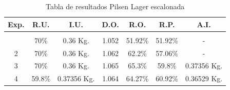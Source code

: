 \begin{longtable}{|p{1cm}|p{1.7cm}|p{2cm}|p{2cm}|p{2cm}| p{1cm}| p{1cm}|}
        \hline
        Exp. %
        & \multicolumn{1}{c|}{R.U.} %
        & \multicolumn{1}{c|}{I.U.} %
        & \multicolumn{1}{c|}{D.O.} %
        & \multicolumn{1}{c|}{R.O.} %
        & \multicolumn{1}{c|}{R.P.} %
        & \multicolumn{1}{c|}{A.I.} %
        \\
        \endfirsthead
        
        \endhead
 
        \endfoot
        
        \hline
        
        \caption{Tabla de resultados Pilsen Lager escalonada\label{tab:ResultadosPilsenEscalonada}}\\
        \endlastfoot
        
        \hline
             \multicolumn{1}{|c|}{1} 
             & \multicolumn{1}{c|}{70\%} 
             & \multicolumn{1}{c|}{0.36 Kg.}
             & \multicolumn{1}{c|}{1.052}
             & \multicolumn{1}{c|}{51.92\%}
             & \multicolumn{1}{c|}{51.92\%} 
             & \multicolumn{1}{c|}{-} \\
             \hline
             
             \multicolumn{1}{|c|}{2} 
             & \multicolumn{1}{c|}{70\%}  
             & \multicolumn{1}{c|}{0.36 Kg.}
             & \multicolumn{1}{c|}{1.062}
             & \multicolumn{1}{c|}{62.2\%}
             & \multicolumn{1}{c|}{57.06\%} 
             & \multicolumn{1}{c|}{-} \\
             \hline
             
             \multicolumn{1}{|c|}{3} 
             & \multicolumn{1}{c|}{70\%} 
             & \multicolumn{1}{c|}{0.36 Kg.}
             & \multicolumn{1}{c|}{1.065}
             & \multicolumn{1}{c|}{65.3\%}
             & \multicolumn{1}{c|}{59.8\%}
             & \multicolumn{1}{c|}{0.37356 Kg.} \\
             \hline
             
             \multicolumn{1}{|c|}{4} 
             & \multicolumn{1}{c|}{59.8\%}  
             & \multicolumn{1}{c|}{0.37356 Kg.}
             & \multicolumn{1}{c|}{1.064}
             & \multicolumn{1}{c|}{64.27\%}
             & \multicolumn{1}{c|}{60.92\%}
             & \multicolumn{1}{c|}{0.36529 Kg.} \\
             \hline
             

\end{longtable}
